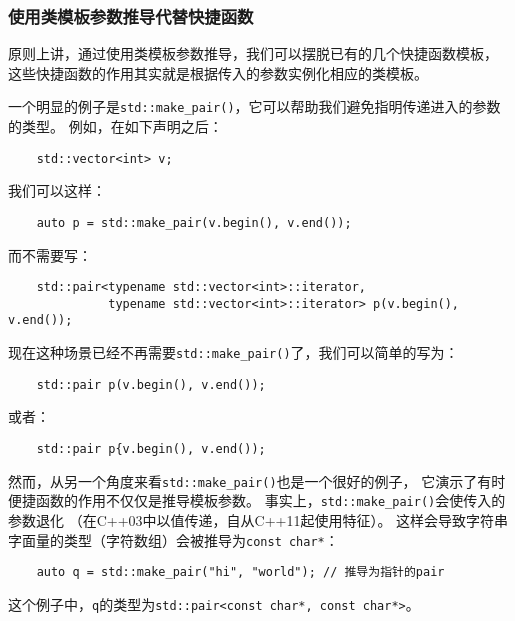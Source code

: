 \subsubsection{使用类模板参数推导代替快捷函数}\label{ch9.1.4}
原则上讲，通过使用类模板参数推导，我们可以摆脱已有的几个快捷函数模板，
这些快捷函数的作用其实就是根据传入的参数实例化相应的类模板。

一个明显的例子是\texttt{std::make\_pair()}，它可以帮助我们避免指明传递进入的参数的类型。
例如，在如下声明之后：
\begin{lstlisting}
    std::vector<int> v;
\end{lstlisting}
我们可以这样：
\begin{lstlisting}
    auto p = std::make_pair(v.begin(), v.end());
\end{lstlisting}
而不需要写：
\begin{lstlisting}
    std::pair<typename std::vector<int>::iterator,
              typename std::vector<int>::iterator> p(v.begin(), v.end());
\end{lstlisting}
现在这种场景已经不再需要\texttt{std::make\_pair()}了，我们可以简单的写为：
\begin{lstlisting}
    std::pair p(v.begin(), v.end());
\end{lstlisting}
或者：
\begin{lstlisting}
    std::pair p{v.begin(), v.end());
\end{lstlisting}

然而，从另一个角度来看\texttt{std::make\_pair()}也是一个很好的例子，
它演示了有时便捷函数的作用不仅仅是推导模板参数。
事实上，\texttt{std::make\_pair()}会使传入的参数退化
（在C++03中以值传递，自从C++11起使用特征）。
这样会导致字符串字面量的类型（字符数组）会被推导为\texttt{const char*}：
\begin{lstlisting}
    auto q = std::make_pair("hi", "world"); // 推导为指针的pair
\end{lstlisting}
这个例子中，\texttt{q}的类型为\texttt{std::pair<const char*, const char*>}。

